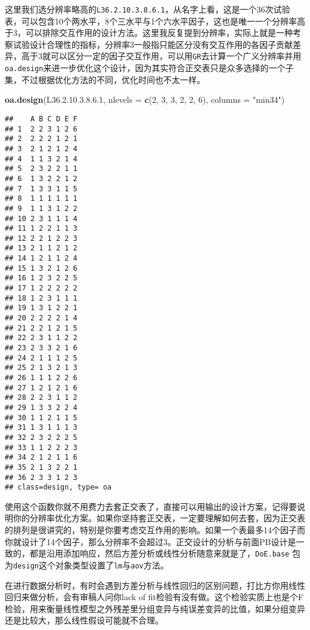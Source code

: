 \documentclass[]{tufte-book}
\newenvironment{Shaded}{}{}
\newcommand{\DataTypeTok}[1]{\textcolor[rgb]{0.56,0.13,0.00}{#1}}
\newcommand{\DecValTok}[1]{\textcolor[rgb]{0.25,0.63,0.44}{#1}}
\newcommand{\FloatTok}[1]{\textcolor[rgb]{0.25,0.63,0.44}{#1}}
\newcommand{\KeywordTok}[1]{\textcolor[rgb]{0.00,0.44,0.13}{\textbf{#1}}}
\newcommand{\NormalTok}[1]{#1}
\newcommand{\StringTok}[1]{\textcolor[rgb]{0.25,0.44,0.63}{#1}}
\begin{document}
这里我们选分辨率略高的\texttt{L36.2.10.3.8.6.1}，从名字上看，这是一个36次试验表，可以包含10个两水平，8个三水平与1个六水平因子，这也是唯一一个分辨率高于3，可以排除交互作用的设计方法。这里我反复提到分辨率，实际上就是一种考察试验设计合理性的指标，分辨率3一般指只能区分没有交互作用的各因子贡献差异，高于3就可以区分一定的因子交互作用，可以用\texttt{GR}去计算一个广义分辨率并用\texttt{oa.design}来进一步优化这个设计，因为其实符合正交表只是众多选择的一个子集，不过根据优化方法的不同，优化时间也不太一样。

\begin{Shaded}
\begin{Highlighting}[]
\KeywordTok{oa.design}\NormalTok{(L36.}\DecValTok{2}\NormalTok{.}\DecValTok{10}\NormalTok{.}\DecValTok{3}\NormalTok{.}\DecValTok{8}\NormalTok{.}\FloatTok{6.1}\NormalTok{, }\DataTypeTok{nlevels =} \KeywordTok{c}\NormalTok{(}\DecValTok{2}\NormalTok{, }\DecValTok{3}\NormalTok{, }
    \DecValTok{3}\NormalTok{, }\DecValTok{2}\NormalTok{, }\DecValTok{2}\NormalTok{, }\DecValTok{6}\NormalTok{), }\DataTypeTok{columns =} \StringTok{"min34"}\NormalTok{)}
\end{Highlighting}
\end{Shaded}

\begin{verbatim}
##    A B C D E F
## 1  2 2 3 1 2 6
## 2  2 2 2 1 2 1
## 3  2 1 2 1 2 4
## 4  1 1 3 2 1 4
## 5  2 3 2 2 1 1
## 6  1 3 2 2 1 2
## 7  1 3 3 1 1 5
## 8  1 1 1 1 1 1
## 9  1 1 3 1 2 2
## 10 2 3 1 1 1 4
## 11 1 2 2 1 1 3
## 12 2 2 1 2 2 3
## 13 2 1 1 2 1 2
## 14 1 2 1 1 2 4
## 15 1 3 2 1 2 6
## 16 1 2 3 2 2 5
## 17 1 2 2 2 2 2
## 18 1 2 3 1 1 1
## 19 1 3 1 2 2 1
## 20 2 2 2 2 1 4
## 21 2 2 1 2 1 5
## 22 2 3 1 1 2 2
## 23 2 3 3 2 1 6
## 24 2 1 1 1 2 5
## 25 2 1 3 2 1 3
## 26 1 1 1 2 2 6
## 27 1 2 1 2 1 6
## 28 2 2 3 1 1 2
## 29 1 3 3 2 2 4
## 30 1 1 2 1 1 5
## 31 1 3 1 1 1 3
## 32 2 3 2 2 2 5
## 33 1 1 2 2 2 3
## 34 2 1 2 1 1 6
## 35 2 1 3 2 2 1
## 36 2 3 3 1 2 3
## class=design, type= oa
\end{verbatim}

使用这个函数你就不用费力去套正交表了，直接可以用输出的设计方案，记得要说明你的分辨率优化方案。如果你坚持套正交表，一定要理解如何去套，因为正交表的排列是很讲究的，特别是你要考虑交互作用的影响。如果一个表最多14个因子而你就设计了14个因子，那么分辨率不会超过3。正交设计的分析与前面PB设计是一致的，都是沿用添加响应，然后方差分析或线性分析随意来就是了，\texttt{DoE.base} 包为\texttt{design}这个对象类型设置了\texttt{lm}与\texttt{aov}方法。

在进行数据分析时，有时会遇到方差分析与线性回归的区别问题，打比方你用线性回归来做分析，会有审稿人问你lack of fit检验有没有做。这个检验实质上也是个F检验，用来衡量线性模型之外残差里分组变异与纯误差变异的比值，如果分组变异还是比较大，那么线性假设可能就不合理。
\end{document}
